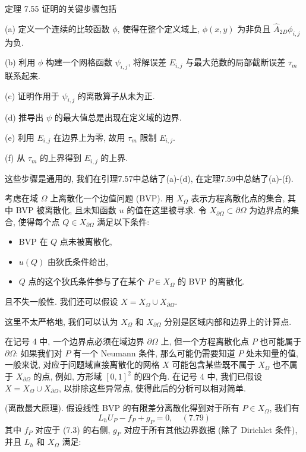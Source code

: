 \documentclass[a4paper]{ctexart}
\newcommand{\hl}[1]
{\noindent {\bf {#1}}}
\begin{document}
{定理 7.55 证明的关键步骤包括

(a) 定义一个连续的比较函数 $\phi$, 使得在整个定义域上, $\phi(x, y)$ 
为非负且 $\hat{A}_{2D} \phi_{i,j}$ 为负.

(b) 利用 $\phi$ 构建一个网格函数 $\psi_{i,j}$, 
将解误差 $E_{i,j}$ 与最大范数的局部截断误差 $\tau_m$ 联系起来.

(c) 证明作用于 $\psi_{i,j}$ 的离散算子从未为正. 

(d) 推导出 $\psi$ 的最大值总是出现在定义域的边界.

(e) 利用 $E_{i,j}$ 在边界上为零, 故用 $\tau_m$ 限制 $E_{i,j}$.

(f) 从 $\tau_m$ 的上界得到 $E_{i,j}$ 的上界.

这些步骤是通用的, 我们在引理7.57中总结了(a)-(d), 在定理7.59中总结了(a)-(f).

\hl{记号 4} 考虑在域 $\Omega$ 上离散化一个边值问题 (BVP). 
用 $X_{\Omega}$ 表示方程离散化点的集合, 其中 BVP 被离散化, 
且未知函数 $u$ 的值在这里被寻求. 
令 $X_{\partial\Omega} \subset \partial\Omega$ 为边界点的集合, 
使得每个点 $Q \in X_{\partial\Omega}$ 满足以下条件:
\begin{itemize}
  \item BVP 在 $Q$ 点未被离散化, 
  \item $u(Q)$ 由狄氏条件给出,
  \item $Q$ 点的这个狄氏条件参与了在某个 $P \in X_{\Omega}$ 的 BVP 的离散化.
\end{itemize}

且不失一般性. 我们还可以假设 $X = X_{\Omega} \cup X_{\partial\Omega}$. 

这里不太严格地, 我们可以认为 $X_{\Omega}$ 和 $X_{\partial\Omega}$ 
分别是区域内部和边界上的计算点.

\hl{例 7.56} 在记号 4 中, 一个边界点必须在域边界 $\partial \Omega$ 上, 
但一个方程离散化点 $P$ 也可能属于 $\partial \Omega$: 
如果我们对 $P$ 有一个 Neumann 条件, 那么可能仍需要知道 $P$ 处未知量的值, 
一般来说, 对应于问题域直接离散化的网格 $X$ 可能包含某些既不属于 $X_{\Omega}$ 
也不属于 $X_{\partial \Omega}$ 的点, 例如, 
方形域 $[0, 1]^2$ 的四个角. 
在记号 4 中, 我们已假设 $X = X_{\Omega} \cup X_{\partial \Omega}$, 
以排除这些异常点, 使得此后的分析可以相对简单. 

\hl{引理 7.57} (离散最大原理). 假设线性 BVP 的有限差分离散化得到对于所有 
$P \in X_{\Omega}$, 我们有 
$$
L_hU_P - f_P + g_P = 0, \quad (7.79)
$$
其中 $f_P$ 对应于 (7.3) 的右侧, $g_P$ 对应于所有其他边界数据 (除了 Dirichlet 条件),
并且 $L_h$ 和 $X_{\Omega}$ 满足:

}
\end{document}
